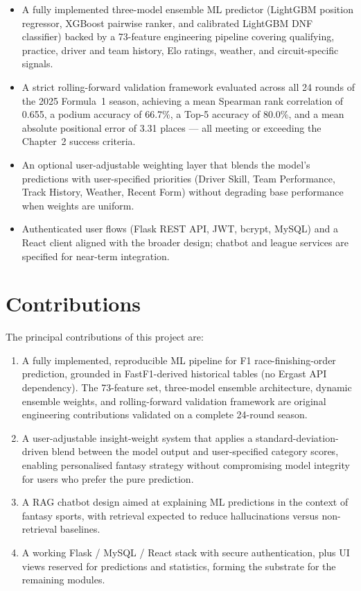 \documentclass[12pt, a4paper, oneside]{report}
\begin{document}
\begin{itemize}[leftmargin=*]
  \item A fully implemented three-model ensemble ML predictor (LightGBM position
        regressor, XGBoost pairwise ranker, and calibrated LightGBM DNF
        classifier) backed by a 73-feature engineering pipeline covering
        qualifying, practice, driver and team history, Elo ratings, weather,
        and circuit-specific signals.
  \item A strict rolling-forward validation framework evaluated across all
        24 rounds of the 2025 Formula~1 season, achieving a mean Spearman
        rank correlation of 0.655, a podium accuracy of 66.7\%, a Top-5
        accuracy of 80.0\%, and a mean absolute positional error of
        3.31 places --- all meeting or exceeding the Chapter~2 success
        criteria.
  \item An optional user-adjustable weighting layer that blends the model's
        predictions with user-specified priorities (Driver Skill, Team
        Performance, Track History, Weather, Recent Form) without degrading
        base performance when weights are uniform.
  \item Authenticated user flows (Flask REST API, JWT, bcrypt, MySQL) and a
        React client aligned with the broader design; chatbot and league
        services are specified for near-term integration.
\end{itemize}

\section{Contributions}

The principal contributions of this project are:

\begin{enumerate}[leftmargin=*]
  \item A fully implemented, reproducible ML pipeline for F1 race-finishing-order
        prediction, grounded in FastF1-derived historical tables (no Ergast API
        dependency). The 73-feature set, three-model ensemble architecture,
        dynamic ensemble weights, and rolling-forward validation framework are
        original engineering contributions validated on a complete 24-round
        season.
  \item A user-adjustable insight-weight system that applies a standard-deviation-
        driven blend between the model output and user-specified category scores,
        enabling personalised fantasy strategy without compromising model
        integrity for users who prefer the pure prediction.
  \item A RAG chatbot design aimed at explaining ML predictions in the context
        of fantasy sports, with retrieval expected to reduce hallucinations
        versus non-retrieval baselines.
  \item A working Flask / MySQL / React stack with secure authentication, plus
        UI views reserved for predictions and statistics, forming the substrate
        for the remaining modules.
\end{enumerate}
\end{document}
